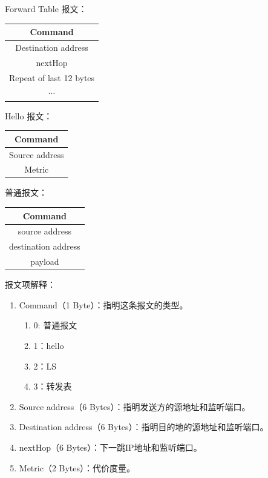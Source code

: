 		\par Forward Table 报文：
		\begin{table}[H]
		\centering
			\begin{tabular}{|c|}
				\hline
				Command \\
				\hline
				Destination address \\
				\hline
				nextHop \\
				\hline
				Repeat of last 12 bytes \\
				\hline
				$\cdots$ \\
				\hline
			\end{tabular}		
		\end{table}
		\par Hello 报文：
		\begin{table}[H]
		\centering
			\begin{tabular}{|c|}
				\hline
				Command        \\
				\hline
				Source address \\
				\hline
				Metric         \\
				\hline
			\end{tabular}
		\end{table}
		\par 普通报文：
		\begin{table}[H]
		\centering
			\begin{tabular}{|c|}
				\hline
				Command \\
				\hline
				source address \\
				\hline
				destination address \\
				\hline
				payload \\
				\hline
			\end{tabular}		
		\end{table}
		\par 报文项解释：
		\begin{enumerate}
			\item Command（1 Byte）：指明这条报文的类型。
				\begin{enumerate}[]
					\item 0: 普通报文
					\item 1：hello
					\item 2：LS
					\item 3：转发表
				\end{enumerate}
			\item Source address（6 Bytes）：指明发送方的源地址和监听端口。
			\item Destination address（6 Bytes）：指明目的地的源地址和监听端口。
			\item nextHop（6 Bytes）：下一跳IP地址和监听端口。
			\item Metric（2 Bytes）：代价度量。
		\end{enumerate}
			
